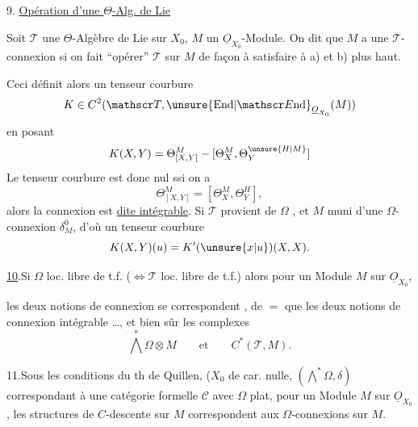 
9.\quad {} \uline{Opération d'une $\Theta$-Alg. de Lie}

Soit $\mathscr T$ une $\Theta$-Algèbre de Lie sur $X_0$, $M$ un $\underline O_{X_0}$-Module. On dit que  $M$ a une $\mathscr T$-connexion si on fait ``opérer'' $\mathscr T$ sur $M$ de façon à satisfaire à a) et b) plus haut.

Ceci définit alors un tenseur courbure
\[
K\in C^2(\mathscr T,\unsure{\mathrm{End}|\mathscr E\mathrm{nd}}_{\underline O_{X_0}}(M))
\]
en posant
\[
K(X,Y)=\Theta_{[X,Y]}^M-[\Theta_X^M,\Theta_Y^{\unsure{H|M}}]
\]
Le tenseur courbure est donc nul ssi on a
\[
\Theta_{[X,Y]}^M=[\Theta_X^M,\Theta_Y^H],
\]
alors la connexion est \uline{dite intégrable}. Si $\mathscr T$ provient de $\Omega$ , et $M$  muni d'une $\Omega$-connexion $\delta_M^0$, d'où un tenseur courbure
\[
K(X,Y)(u)=K'(\unsure{x|u})(X,X).
\]

\uline{10}.\quad Si  $\Omega$ loc. libre de t.f. ($\Longleftrightarrow\mathscr T$  loc. libre de t.f.) alors pour un Module $M$ sur $\underline O_{X_0}$,


les deux notions de connexion se correspondent , de $=$ que les deux notions de  connexion intégrable \ldots, et bien sûr les complexes
\[
\bigwedge^*\Omega\otimes M\qquad\text{et}\qquad C^*(\mathscr T,M).
\]

11.\quad Sous les conditions du th de Quillen, ($X_0$ de car. nulle,  $(\bigwedge^*\Omega,\delta)$  correspondant à une catégorie formelle $\mathcal C$ avec $\Omega$ plat, pour un Module $M$ sur $\underline O_{X_0}$, les structures de $C$-descente sur $M$ correspondent aux  $\Omega$-connexions sur $M$.

